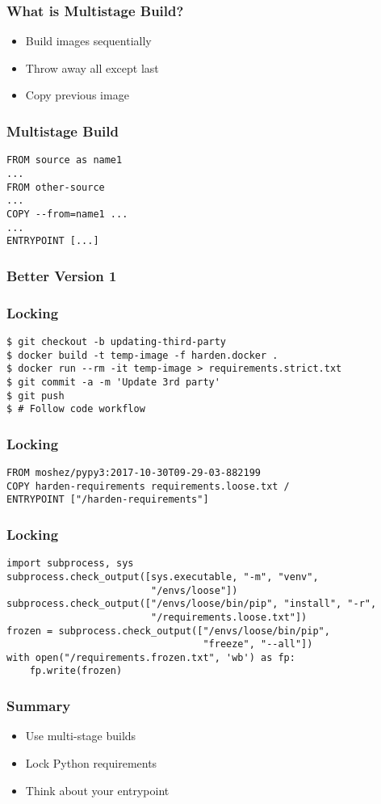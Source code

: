 \documentclass{beamer}
\begin{document}
\begin{frame}[fragile]
\frametitle{What is Multistage Build?}
\begin{itemize}
\item Build images sequentially \pause
\item Throw away all except last \pause
\item Copy previous image
\end{itemize}
\end{frame}

\begin{frame}[fragile]
\frametitle{Multistage Build}
\begin{lstlisting}
FROM source as name1
...
FROM other-source
...
COPY --from=name1 ...
...
ENTRYPOINT [...]
\end{lstlisting}
\end{frame}

\begin{frame}[fragile]
\frametitle{Better Version 1}
\pause
\pause
\pause
\pause

\end{frame}

\begin{frame}[fragile]
\frametitle{Locking}
\begin{lstlisting}
$ git checkout -b updating-third-party
$ docker build -t temp-image -f harden.docker .
$ docker run --rm -it temp-image > requirements.strict.txt
$ git commit -a -m 'Update 3rd party'
$ git push
$ # Follow code workflow
\end{lstlisting}
\end{frame}

\begin{frame}[fragile]
\frametitle{Locking}
\begin{lstlisting}
FROM moshez/pypy3:2017-10-30T09-29-03-882199
COPY harden-requirements requirements.loose.txt /
ENTRYPOINT ["/harden-requirements"]
\end{lstlisting}
\end{frame}

\begin{frame}[fragile]
\frametitle{Locking}
\begin{lstlisting}
import subprocess, sys
subprocess.check_output([sys.executable, "-m", "venv",
                         "/envs/loose"])
subprocess.check_output(["/envs/loose/bin/pip", "install", "-r",
                         "/requirements.loose.txt"])
frozen = subprocess.check_output(["/envs/loose/bin/pip",
                                  "freeze", "--all"])
with open("/requirements.frozen.txt", 'wb') as fp:
    fp.write(frozen)
\end{lstlisting}
\end{frame}

\begin{frame}
\frametitle{Summary}
\begin{itemize}
\item Use multi-stage builds \pause
\item Lock Python requirements \pause
\item Think about your entrypoint
\end{itemize}
\end{frame}
\end{document}
